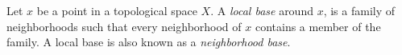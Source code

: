 \documentclass{article}
\begin{document}
Let $x$ be a point in a topological space $X$. A \emph{local base} around $x$, is a family of neighborhoods such that every neighborhood of $x$ contains a member of the family. A local base is also known as a \emph{neighborhood base}.
\end{document}
